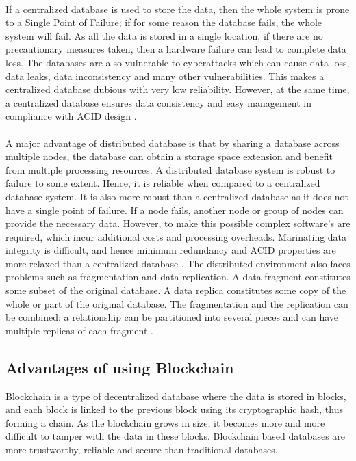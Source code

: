 \documentclass{article}
\begin{document}
        \paragraph{}
        If a centralized database is used to store the data, then the whole system is prone to a Single Point of Failure; if for some reason the database fails, the whole system will fail. As all the data is stored in a single location, if there are no precautionary measures taken, then a hardware failure can lead to complete data loss. The databases are also vulnerable to cyberattacks which can cause data loss, data leaks, data inconsistency and many other vulnerabilities. This makes a centralized database dubious with very low reliability. However, at the same time, a centralized database ensures data consistency and easy management in compliance with ACID design \cite{centralizeddistributeddatabases}.
        
        \paragraph{}
        A major advantage of distributed database is that by sharing a database across multiple nodes, the database can obtain a storage space extension and benefit from multiple processing resources. A distributed database system is robust to failure to some extent. Hence, it is reliable when compared to a  centralized database system. It is also more robust than a centralized database as it does not have a single point of failure. If a node fails, another node or group of nodes can provide the necessary data. However, to make this possible complex software's are required, which incur additional costs and processing overheads. Marinating data integrity is difficult, and hence minimum redundancy and ACID properties are more relaxed than a centralized database \cite{centralizeddistributeddatabases}. The distributed environment also faces problems such as fragmentation and data replication. A data fragment constitutes some subset of the original database. A data replica constitutes some copy of the whole or part of the original database. The fragmentation and the replication can be combined: a relationship can be partitioned into several pieces and can have multiple replicas of each fragment \cite{distributedsystems}.
        
    \subsection{Advantages of using Blockchain}
        Blockchain is a type of decentralized database where the data is stored in blocks, and each block is linked to the previous block using its cryptographic hash, thus forming a chain. As the blockchain grows in size, it becomes more and more difficult to tamper with the data in these blocks. Blockchain based databases are more trustworthy, reliable and secure than traditional databases.
\end{document}
